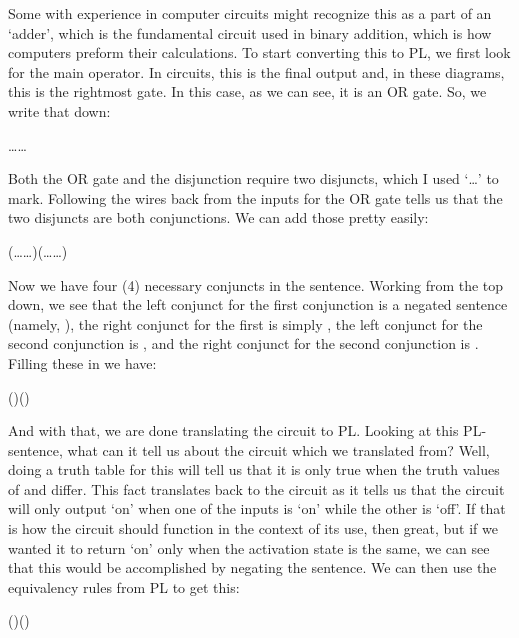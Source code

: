 Some with experience in computer circuits might recognize this as a part of an `adder', which is the fundamental circuit used in binary addition, which is how computers preform their calculations.  To start converting this to PL, we first look for the main operator. In circuits, this is the final output and, in these diagrams, this is the rightmost gate. In this case, as we can see, it is an OR gate. So, we write that down:

\begin{center}
\ldots\eor\ldots
\end{center}

Both the OR gate and the disjunction require two disjuncts, which I used `\ldots' to mark. Following the wires back from the inputs for the OR gate tells us that the two disjuncts are both conjunctions. We can add those pretty easily:

\begin{center}
(\ldots\eand\ldots)\eor(\ldots\eand\ldots)
\end{center}
 
Now we have four (4) necessary conjuncts in the sentence. Working from the top down, we see that the left conjunct for the first conjunction is a negated sentence (namely, \enot{}), the right conjunct for the first is simply , the left conjunct for the second conjunction is , and the right conjunct for the second conjunction is \enot{}. Filling these in we have:

\begin{center}
(\enot{}\eand{})\eor(\eand\enot{})
\end{center}

And with that, we are done translating the circuit to PL. Looking at this PL-sentence, what can it tell us about the circuit which we translated from? Well, doing a truth table for this will tell us that it is only true when the truth values of  and  differ. This fact translates back to the circuit as it tells us that the circuit will only output `on' when one of the inputs is `on' while the other is `off'. If that is how the circuit should function in the context of its use, then great, but if we wanted it to return `on' only when the activation state is the same, we can see that this would be accomplished by negating the sentence. We can then use the equivalency rules from PL to get this:

\begin{center}
(\enot{}\eor{})\eand(\eor\enot{})
\end{center}

